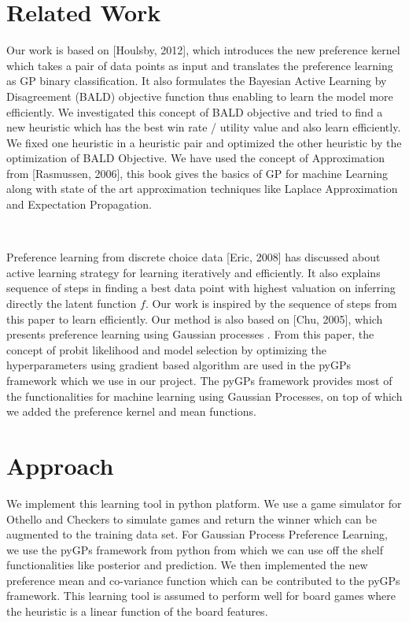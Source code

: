 \documentclass{scrartcl}
\begin{document}
\section{Related Work}

Our work is based on [Houlsby, 2012], which introduces the new preference kernel which takes a pair of data points as input and translates the preference learning as GP binary classification. It also formulates the Bayesian Active Learning by Disagreement (BALD) objective function thus enabling to learn the model more efficiently. We investigated this concept of BALD objective and tried to find a new heuristic which has the best win rate / utility value and also learn efficiently. We fixed one heuristic in a heuristic pair and optimized the other heuristic by the optimization of BALD Objective. We have used the concept of Approximation from [Rasmussen, 2006], this book gives the basics of GP for machine Learning along with state of the art approximation techniques like Laplace Approximation and Expectation Propagation.

 \hfill \

Preference learning from discrete choice data [Eric, 2008] has discussed about active learning strategy for learning iteratively and efficiently. It also explains sequence of steps in finding a best data point with highest valuation on inferring directly the latent function $f$. Our work is inspired by the sequence of steps from this paper to learn efficiently. Our method is also based on [Chu, 2005], which presents preference learning using Gaussian processes . From this paper, the concept of probit likelihood and model selection by optimizing the hyperparameters using gradient based algorithm are used in the pyGPs framework which we use in our project. The pyGPs framework \cite{NeuMarHuaKer15} provides most of the functionalities for machine learning using Gaussian Processes, on top of which we added the preference kernel and mean functions.


	
	\section {Approach}
We implement this learning tool in python platform. We use a game simulator for Othello and Checkers to simulate games and return the winner which can be augmented to the training data set. For Gaussian Process Preference Learning, we use the pyGPs framework from python from which we can use off the shelf functionalities like posterior and prediction. We then implemented the new preference mean and co-variance function which can be contributed to the pyGPs \cite{NeuMarHuaKer15} framework. This learning tool is assumed to perform well for board games where the heuristic is a linear function of the board features.
\end{document}
